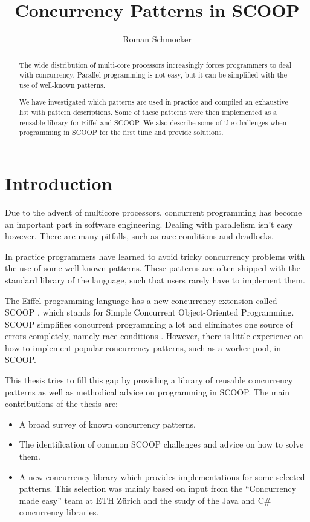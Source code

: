 \documentclass[a4paper,10pt]{article}
\title{Concurrency Patterns in SCOOP}
\author{Roman Schmocker}
\begin{document}
\maketitle

\begin{abstract}
The wide distribution of multi-core processors increasingly forces programmers to deal with concurrency.
Parallel programming is not easy, but it can be simplified with the use of well-known patterns.

We have investigated which patterns are used in practice and compiled an exhaustive list with pattern descriptions.
Some of these patterns were then implemented as a reusable library for Eiffel and SCOOP.
We also describe some of the challenges when programming in SCOOP for the first time and provide solutions.
\end{abstract}


\tableofcontents

\section{Introduction}
\label{sec:introduction}

Due to the advent of multicore processors, concurrent programming has become an important part in software engineering.
Dealing with parallelism isn't easy however.
There are many pitfalls, such as race conditions and deadlocks.

In practice programmers have learned to avoid tricky concurrency problems with the use of some well-known patterns.
These patterns are often shipped with the standard library of the language, such that users rarely have to implement them.

The Eiffel programming language \cite{web:ecma-eiffel}\cite{book:touchofclass} has a new concurrency extension called SCOOP \cite{Nienaltowski07}\cite{web:scoop},
which stands for Simple Concurrent Object-Oriented Programming.
SCOOP simplifies concurrent programming a lot and eliminates one source of errors completely, namely race conditions \cite{Nienaltowski07}.
However, there is little experience on how to implement popular concurrency patterns, such as a worker pool, in SCOOP.

This thesis tries to fill this gap by providing a library of reusable concurrency patterns as well as methodical advice on programming in SCOOP.
The main contributions of the thesis are:
\begin{itemize}
 \item A broad survey of known concurrency patterns.
 \item The identification of common SCOOP challenges and advice on how to solve them.
 \item A new concurrency library which provides implementations for some selected patterns.
 This selection was mainly based on input from the ``Concurrency made easy'' team at ETH Zürich and the study of the Java \cite{web:java-concurrency} and C\# \cite{web:ms-tpl} concurrency libraries.
\end{itemize}
\end{document}
